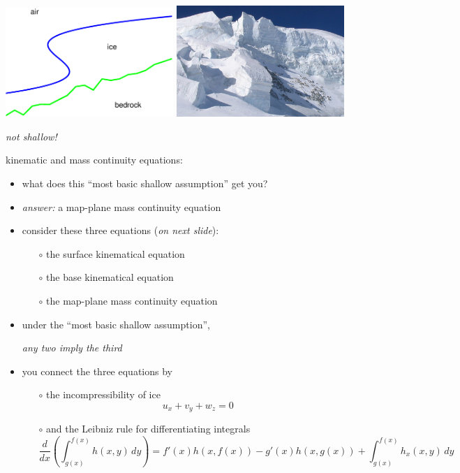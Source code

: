 \documentclass[titlepage,letterpaper,final,12pt]{scrartcl}
\newcommand{\alert}[1]{\emph{#1}}
\begin{document}
\begin{center}
\includegraphics[width=2.5in]{sshape}
\quad
\includegraphics[width=2.5in]{Serac2}

\alert{not shallow!}
\end{center}


kinematic and mass continuity equations:

\begin{itemize}
\item what does this ``most basic shallow assumption'' get you?
\item \emph{answer:} a map-plane mass continuity equation
\item consider these three equations (\emph{on next slide}):
  \begin{itemize}
  \item[$\circ$]  the surface kinematical equation
  \item[$\circ$]  the base kinematical equation
  \item[$\circ$]  the map-plane mass continuity equation
  \end{itemize}
\item under the ``most basic shallow assumption'', 

\begin{center}\emph{any two imply the third}\end{center}
\item you connect the three equations by
  \begin{itemize}
  \item[$\circ$]  the incompressibility of ice
    $$u_x + v_y + w_z = 0$$
  \item[$\circ$]  and the Leibniz rule for differentiating integrals
  \scriptsize
    $$\frac{d}{dx}\left(\int_{g(x)}^{f(x)} h(x,y)\,dy\right) = f'(x) h(x,f(x)) - g'(x) h(x,g(x)) + \int_{g(x)}^{f(x)} h_x(x,y)\,dy$$
  \end{itemize}
\end{itemize}
\end{document}
